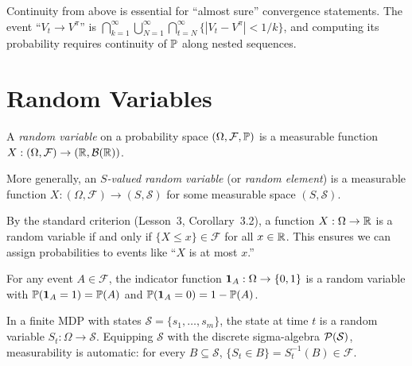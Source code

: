 \documentclass[11pt,a4paper]{article}
\begin{document}
\begin{rlconnection}[title={Connection to RL}]
Continuity from above is essential for ``almost sure'' convergence
statements. The event ``$V_t \to V^\pi$'' is
$\bigcap_{k=1}^\infty \bigcup_{N=1}^\infty
\bigcap_{t=N}^\infty \{|V_t - V^\pi| < 1/k\}$, and computing its
probability requires continuity of $\mathbb{P}$ along nested sequences.
\end{rlconnection}


\section{Random Variables}
\label{sec:rv}

\begin{definition}
\label{def:rv}
A \emph{random variable} on a probability space
$(\Omega, \mathcal{F}, \mathbb{P})$ is a measurable function
$X: (\Omega, \mathcal{F}) \to (\mathbb{R}, \mathcal{B}(\mathbb{R}))$.

More generally, an \emph{$S$-valued random variable} (or \emph{random
element}) is a measurable function
$X: (\Omega, \mathcal{F}) \to (S, \mathcal{S})$ for some measurable space
$(S, \mathcal{S})$.
\end{definition}

\begin{remark}
By the standard criterion (Lesson~3, Corollary~3.2), a function
$X: \Omega \to \mathbb{R}$ is a random variable if and only if
$\{X \leq x\} \in \mathcal{F}$ for all $x \in \mathbb{R}$. This ensures we can
assign probabilities to events like ``$X$ is at most $x$.''
\end{remark}

\begin{example}
\label{ex:indicator_rv}
For any event $A \in \mathcal{F}$, the indicator function
$\mathbf{1}_A: \Omega \to \{0, 1\}$ is a random variable with
$\mathbb{P}(\mathbf{1}_A = 1) = \mathbb{P}(A)$ and
$\mathbb{P}(\mathbf{1}_A = 0) = 1 - \mathbb{P}(A)$.
\end{example}

\begin{example}
\label{ex:state_rv}
In a finite MDP with states $\mathcal{S} = \{s_1, \ldots, s_m\}$, the
state at time $t$ is a random variable
$S_t: \Omega \to \mathcal{S}$. Equipping $\mathcal{S}$ with the discrete
sigma-algebra $\mathcal{P}(\mathcal{S})$, measurability is automatic: for
every $B \subseteq \mathcal{S}$,
$\{S_t \in B\} = S_t^{-1}(B) \in \mathcal{F}$.
\end{example}
\end{document}
